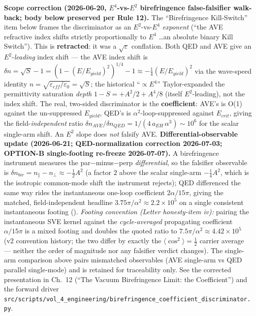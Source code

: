 \noindent\textbf{Scope correction (2026-06-20, $E^4$-vs-$E^2$ birefringence false-falsifier walk-back; body below preserved per Rule 12).} The ``Birefringence Kill-Switch'' item below frames the discriminator as an $E^2$-vs-$E^4$ \emph{exponent} (``the AVE refractive index shifts strictly proportionally to $E^4$ \dots an absolute binary Kill Switch''). This is \textbf{retracted}: it was a $\sqrt{\varepsilon}$ conflation. Both QED and AVE give an $E^2$-\emph{leading} index shift --- the AVE index shift is $\delta n = \sqrt{S}-1 = (1-(E/E_{yield})^2)^{1/4}-1 \approx -\tfrac14(E/E_{yield})^2$ via the wave-speed identity $n=\sqrt{\varepsilon_{eff}/\varepsilon_0}=\sqrt{S}$; the historical ``$\propto E^4$'' Taylor-expanded the permittivity saturation \emph{depth} $1-S = +A^2/2 + A^4/8$ (itself $E^2$-leading), not the index shift. The real, two-sided discriminator is the \textbf{coefficient}: AVE's is O(1) against the un-suppressed $E_{yield}$, QED's is $\alpha^2$-loop-suppressed against $E_{crit}$, giving the field-\emph{independent} ratio $\delta n_{AVE}/\delta n_{QED} = 1/(4\,a_{EH}\,\alpha^3)\sim 10^6$ for the scalar single-arm shift. An $E^2$ slope does \emph{not} falsify AVE. \textbf{Differential-observable update (2026-06-21; QED-normalization correction 2026-07-03; OPTION-B single-footing re-freeze 2026-07-07).} A birefringence instrument measures the par$-$minus$-$perp \emph{differential}, so the falsifier observable is $\delta n_{bir}=n_\parallel-n_\perp\approx-\tfrac12 A^2$ (a factor $2$ above the scalar single-arm $-\tfrac14 A^2$, which is the isotropic common-mode shift the instrument rejects); QED differenced the same way rides the instantaneous one-loop coefficient $2\alpha/15\pi$, giving the matched, field-independent headline $3.75\pi/\alpha^2\approx 2.2\times10^5$ on a single consistent instantaneous footing (). \emph{Footing convention (Letter honesty-item iv):} pairing the instantaneous SVE kernel against the \emph{cycle-averaged} propagating coefficient $\alpha/15\pi$ is a mixed footing and doubles the quoted ratio to $7.5\pi/\alpha^2\approx4.42\times10^5$ (v2 convention history; the two differ by exactly the $\langle\cos^2\rangle=\tfrac12$ carrier average --- neither the order of magnitude nor any falsifier verdict changes). The single-arm comparison above pairs mismatched observables (AVE single-arm vs QED parallel single-mode) and is retained for traceability only. See the corrected presentation in Ch.~12 (``The Vacuum Birefringence Limit: the Coefficient'') and the forward driver \texttt{src/scripts/vol\_4\_engineering/birefringence\_coefficient\_discriminator.py}.
